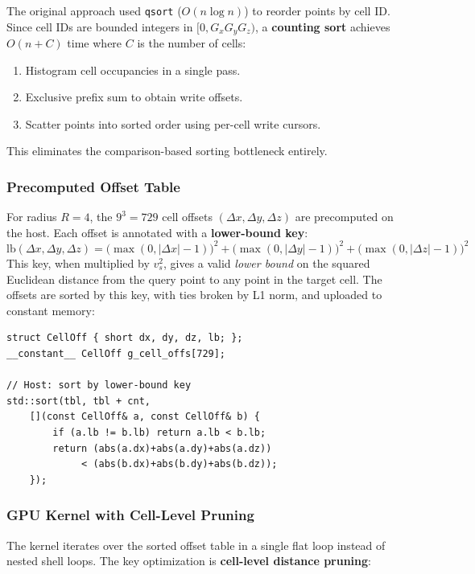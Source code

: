 \documentclass[11pt,a4paper]{article}
\begin{document}
The original approach used \texttt{qsort} ($O(n \log n)$) to reorder points by cell ID. Since cell IDs are bounded integers in $[0, G_x G_y G_z)$, a \textbf{counting sort} achieves $O(n + C)$ time where $C$ is the number of cells:
\begin{enumerate}
    \item Histogram cell occupancies in a single pass.
    \item Exclusive prefix sum to obtain write offsets.
    \item Scatter points into sorted order using per-cell write cursors.
\end{enumerate}
This eliminates the comparison-based sorting bottleneck entirely.

\subsubsection{Precomputed Offset Table}

For radius $R = 4$, the $9^3 = 729$ cell offsets $(\Delta x, \Delta y, \Delta z)$ are precomputed on the host. Each offset is annotated with a \textbf{lower-bound key}:
\[
    \text{lb}(\Delta x, \Delta y, \Delta z) = \bigl(\!\max(0, |\Delta x|{-}1)\bigr)^2 + \bigl(\!\max(0, |\Delta y|{-}1)\bigr)^2 + \bigl(\!\max(0, |\Delta z|{-}1)\bigr)^2
\]
This key, when multiplied by $v_s^2$, gives a valid \emph{lower bound} on the squared Euclidean distance from the query point to any point in the target cell. The offsets are sorted by this key, with ties broken by L1 norm, and uploaded to constant memory:

\begin{lstlisting}[caption={Offset table structure and initialization}]
struct CellOff { short dx, dy, dz, lb; };
__constant__ CellOff g_cell_offs[729];

// Host: sort by lower-bound key
std::sort(tbl, tbl + cnt,
    [](const CellOff& a, const CellOff& b) {
        if (a.lb != b.lb) return a.lb < b.lb;
        return (abs(a.dx)+abs(a.dy)+abs(a.dz))
             < (abs(b.dx)+abs(b.dy)+abs(b.dz));
    });
\end{lstlisting}

\subsubsection{GPU Kernel with Cell-Level Pruning}

The kernel iterates over the sorted offset table in a single flat loop instead of nested shell loops. The key optimization is \textbf{cell-level distance pruning}:
\end{document}
